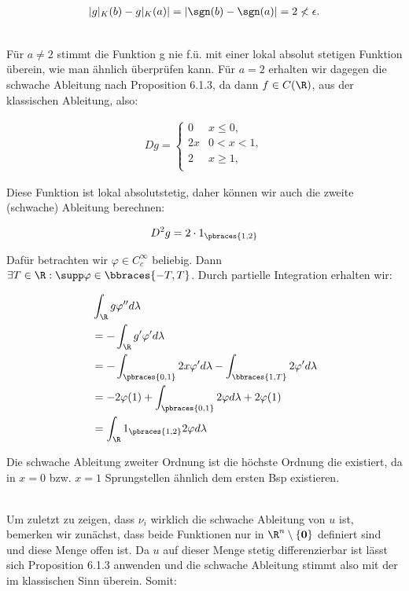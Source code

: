 \begin{solution}
\begin{align*}
  |g|_K(b) - g|_K(a)| = |\sgn(b) - \sgn(a)| = 2 \nless \epsilon.
\end{align*}

\\

Für $a \neq 2$ stimmt die Funktion g nie f.ü. mit einer lokal absolut stetigen
Funktion überein, wie man ähnlich überprüfen kann. Für $a=2$ erhalten wir
dagegen die schwache Ableitung nach Proposition 6.1.3, da dann $f\in C(\R)$,
aus der klassischen Ableitung, also:

\begin{align*}
  Dg=
  \begin{cases}
  0 & x \leq 0, \\
  2x & 0 < x < 1, \\
  2 & x \geq 1, \\
  \end{cases}
\end{align*}

Diese Funktion ist lokal absolutstetig, daher können wir auch die zweite (schwache)
Ableitung berechnen:

\begin{align*}
  D^2g = 2\cdot 1_{\pbraces{1,2}}
\end{align*}

Dafür betrachten wir $\varphi \in C^{\infty}_c$ beliebig. Dann
$\exists T \in \R: \supp \varphi \in \bbraces{-T,T}$. Durch partielle
Integration erhalten wir:

\begin{align*}
    & \int_{\R}g\varphi^{\prime\prime}d\lambda \\
    & = - \int_{\R}g^{\prime}\varphi^{\prime}d\lambda \\
    & = - \int_{\pbraces{0,1}} 2x\varphi^{\prime}d\lambda -
      \int_{\bbraces{1,T}} 2\varphi^{\prime}d\lambda \\
    & = -2\varphi(1) + \int_{\pbraces{0,1}}2\varphi d\lambda +2\varphi(1) \\
    & = \int_{\R}1_{\pbraces{1,2}}2\varphi d\lambda
\end{align*}

Die schwache Ableitung zweiter Ordnung ist die höchste Ordnung die existiert,
da in $x=0$ bzw. $x=1$ Sprungstellen ähnlich dem ersten Bsp existieren.

\\

Um zuletzt zu zeigen, dass $\nu_i$ wirklich die schwache Ableitung von $u$ ist,
bemerken wir zunächst, dass beide Funktionen nur in $\R^{n} \setminus \{
\textbf{0} \}$
definiert sind und diese Menge offen ist. Da $u$ auf dieser Menge
stetig differenzierbar ist lässt sich Proposition 6.1.3 anwenden und die schwache
Ableitung stimmt also mit der im klassischen Sinn überein. Somit:


\end{solution}
